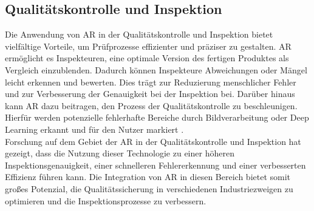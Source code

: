 \subsection{Qualitätskontrolle und Inspektion}
Die Anwendung von AR in der Qualitätskontrolle und Inspektion bietet
vielfältige Vorteile, um Prüfprozesse effizienter und präziser zu gestalten. AR
ermöglicht es Inspekteuren, eine optimale Version des fertigen Produktes als
Vergleich einzublenden. Dadurch können Inspekteure Abweichungen oder Mängel
leicht erkennen und bewerten. Dies trägt zur Reduzierung menschlicher Fehler
und zur Verbesserung der Genauigkeit bei der Inspektion bei. Darüber hinaus
kann AR dazu beitragen, den Prozess der Qualitätskontrolle zu beschleunigen.
Hierfür werden potenzielle fehlerhafte Bereiche durch Bildverarbeitung oder
Deep Learning erkannt und für den Nutzer markiert \cite{9112336}. \\Forschung
auf dem Gebiet der AR in der Qualitätskontrolle und Inspektion hat gezeigt,
dass die Nutzung dieser Technologie zu einer höheren Inspektionsgenauigkeit,
einer schnelleren Fehlererkennung und einer verbesserten Effizienz führen kann.
Die Integration von AR in diesen Bereich bietet somit großes Potenzial, die
Qualitätssicherung in verschiedenen Industriezweigen zu optimieren und die
Inspektionsprozesse zu verbessern. \cite{etonam2019augmented}\\